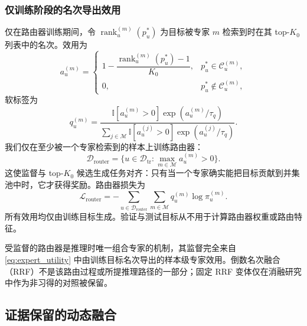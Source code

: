 \documentclass[10pt,fontset=none,twocolumn]{ctexart}
\newcommand{\Experts}{\mathcal{M}}
\newcommand{\Train}{\mathcal{D}_{\mathrm{tr}}}
\newcommand{\Ind}{\mathbb{I}}
\begin{document}
\subsubsection{仅训练阶段的名次导出效用}

仅在路由器训练期间，令 $\operatorname{rank}_{u}^{(m)}(p_u^{*})$ 为目标被专家 $m$ 检索到时在其 top-$K_0$ 列表中的名次。效用为
\begin{equation}
a_{u}^{(m)}
=
\begin{cases}
1-\dfrac{\operatorname{rank}_{u}^{(m)}(p_u^{*})-1}{K_0},
&p_u^{*}\in\mathcal{C}_{u}^{(m)},\\[7pt]
0,&p_u^{*}\notin\mathcal{C}_{u}^{(m)},
\end{cases}
\label{eq:expert_utility}
\end{equation}
软标签为
\begin{equation}
q_{u}^{(m)}
=
\frac{
\Ind[a_u^{(m)}>0]\exp(a_{u}^{(m)}/\tau_q)
}{
\sum_{j\in\Experts}
\Ind[a_u^{(j)}>0]\exp(a_{u}^{(j)}/\tau_q)
}.
\label{eq:utility_target}
\end{equation}
我们仅在至少被一个专家检索到的样本上训练路由器：
\begin{equation}
\mathcal{D}_{\mathrm{router}}
=
\{u\in\Train:\max_{m\in\Experts}a_u^{(m)}>0\}.
\label{eq:router_training_set}
\end{equation}
这使监督与 top-$K_0$ 候选生成任务对齐：只有当一个专家确实能把目标贡献到并集池中时，它才获得奖励。路由器损失为
\begin{equation}
\mathcal{L}_{\mathrm{router}}
=
-
\sum_{u\in\mathcal{D}_{\mathrm{router}}}
\sum_{m\in\Experts}
q_{u}^{(m)}\log\pi_{u}^{(m)}.
\label{eq:router_loss}
\end{equation}
所有效用均仅由训练目标生成。验证与测试目标从不用于计算路由器权重或路由特征。

受监督的路由器是推理时唯一组合专家的机制，其监督完全来自 \eqref{eq:expert_utility} 中由训练目标名次导出的样本级专家效用。倒数名次融合（RRF）不是该路由过程或所提推理路径的一部分；固定 RRF 变体仅在消融研究中作为非习得的对照被保留。

\subsection{证据保留的动态融合}
\label{subsec:fusion}
\end{document}
